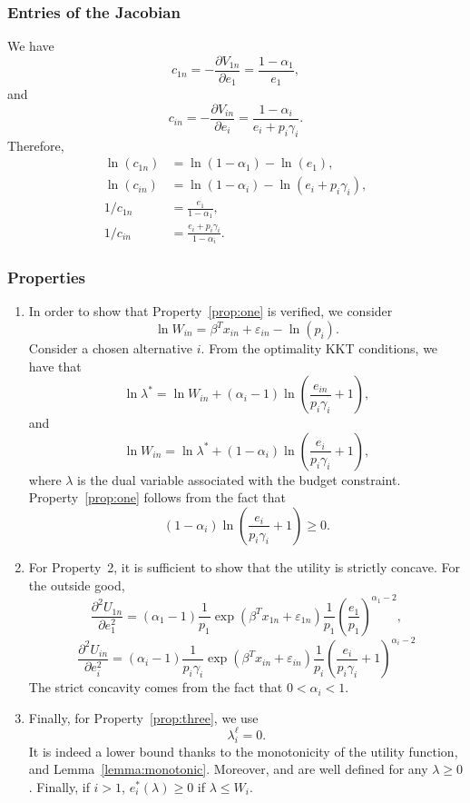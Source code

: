 \documentclass[12pt,a4paper]{article}
\begin{document}
\subsubsection*{Entries of the Jacobian}
We have
\[
c_{1n} = -\frac{\partial V_{1n}}{\partial e_1} = \frac{1-\alpha_1}{e_1},
\]
and
\[
c_{in} = -\frac{\partial V_{in}}{\partial e_i} =\frac{1-\alpha_i}{e_i + p_i \gamma_i}.
\]
Therefore,
\begin{align*}
    \ln(c_{1n}) &= \ln(1-\alpha_1) - \ln(e_1), \\
    \ln(c_{in}) &= \ln(1-\alpha_i) - \ln(e_i + p_i \gamma_i), \\
    1/c_{1n} &= \frac{e_1}{1-\alpha_1}, \\
    1/c_{in} &= \frac{e_i + p_i \gamma_i}{1-\alpha_i}.
\end{align*}

\subsubsection*{Properties}

\begin{enumerate}
\item In order to show that Property~\ref{prop:one} is verified, we consider
\[
    \ln W_{in}  =\beta^T x_{in} + \varepsilon_{in} -\ln(p_i).
\]
Consider a chosen alternative $i$. From the optimality KKT conditions, we have that
\[
   \ln \lambda^* =\ln W_{in}+ (\alpha_i-1) \ln\left(\frac{e_{in}}{p_i \gamma_i}+1\right),
\]
and
\[
    \ln W_{in} =
    \ln \lambda^*  +(1-\alpha_i) \ln\left(\frac{e_i}{p_i \gamma_i}+1\right),
\]
where $\lambda$ is the dual variable associated with the budget constraint.
Property~\ref{prop:one} follows from the fact that
\[
     (1-\alpha_i) \ln\left(\frac{e_i}{p_i \gamma_i}+1\right) \geq 0.
\]
\item For Property~2, it is sufficient to show that the utility is strictly concave.
For the outside good,
\[
   \frac{\partial^2 U_{1n}}{\partial e_1^2} = (\alpha_1-1)\frac{1}{p_1} \exp(\beta^T x_{1n} + \varepsilon_{1n}) \frac{1}{p_1} \left(\frac{e_1}{p_1}\right)^{\alpha_1-2},
   \]
\[
   \frac{\partial^2 U_{in}}{\partial e_i^2} = (\alpha_i-1)\frac{1}{p_i\gamma_i}\exp(\beta^T x_{in} + \varepsilon_{in}) \frac{1}{p_i} \left(\frac{e_i}{p_i \gamma_i}+1\right)^{\alpha_i-2}
\]
The strict concavity comes from the fact that $0 <\alpha_i < 1$.
\item Finally, for Property~\ref{prop:three}, we use \[
              \lambda^\ell_i = 0.
\]
 It is indeed a lower bound thanks to the monotonicity
of the utility function, and Lemma~\ref{lemma:monotonic}.  Moreover,  and
 are well defined for any $\lambda \geq 0$. Finally,
    if $i>1$, $e_i^*(\lambda) \geq 0$ if $\lambda \leq W_i$.
\end{enumerate}
\end{document}
